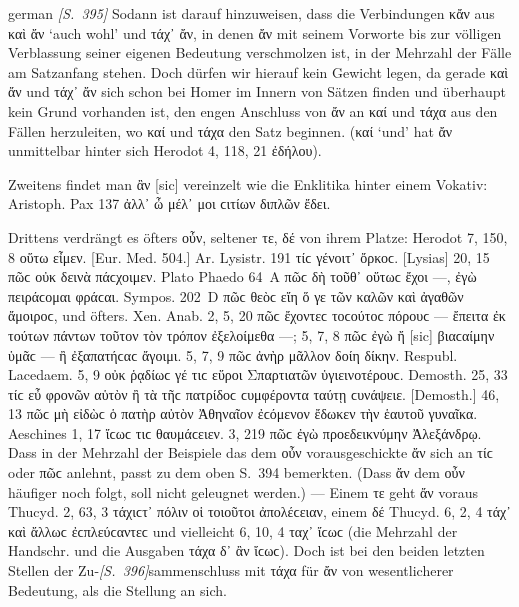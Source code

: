 \begin{otherlanguage*}{german}
\hypertarget{p395}{\emph{[S.~395]}}\label{p395} Sodann ist darauf hinzuweisen, dass die Verbindungen κἄν aus καὶ ἄν ‘auch wohl’ und τάχ᾽ ἄν, in denen ἄν mit seinem Vorworte bis zur völligen Verblassung seiner eigenen Bedeutung verschmolzen ist, in der Mehrzahl der Fälle am Satzanfang stehen. Doch dürfen wir hierauf kein Gewicht legen, da gerade καὶ ἄν und τάχ᾽ ἄν sich schon bei Homer im Innern von Sätzen finden und überhaupt kein Grund vorhanden ist, den engen Anschluss von ἄν an καί und τάχα aus den Fällen herzuleiten, wo καί und τάχα den Satz beginnen. (καί ‘und’ hat ἄν unmittelbar hinter sich Herodot 4, 118, 21  ἐδήλου).

Zweitens findet man ἂν [sic] vereinzelt wie die Enklitika hinter einem Vokativ: Aristoph. Pax 137 ἀλλ᾽ ὦ μέλ᾽  μοι ϲιτίων διπλῶν ἔδει.

Drittens verdrängt es öfters οὖν, seltener τε, δέ von ihrem Platze: Herodot 7, 150, 8 οὕτω  εἶμεν. [Eur. Med. 504.] Ar. Lysistr. 191 τίϲ  γένοιτ᾽  ὄρκοϲ. [Lysias] 20, 15 πῶϲ  οὐκ  δεινὰ πάϲχοιμεν. Plato Phaedo 64~Α πῶϲ  δὴ τοῦθ᾽ οὕτωϲ ἔχοι —, ἐγὼ πειράϲομαι φράϲαι. Sympos. 202~D πῶϲ  θεὸϲ εἴη ὅ γε τῶν καλῶν καὶ ἀγαθῶν ἄμοιροϲ, und öfters. Xen. Anab. 2, 5, 20 πῶϲ  ἔχοντεϲ τοϲούτοϲ πόρουϲ — ἔπειτα ἐκ τούτων πάντων τοῦτον  τὸν τρόπον ἐξελοίμεθα —; 5, 7, 8 πῶϲ  ἐγὼ ἤ [sic] βιαϲαίμην ὑμᾶϲ — ἢ ἐξαπατήϲαϲ ἄγοιμι. 5, 7, 9 πῶϲ  ἀνὴρ μᾶλλον δοίη δίκην. Respubl. Lacedaem. 5, 9 οὐκ  ῥᾳδίωϲ γέ τιϲ εὕροι Σπαρτιατῶν ὑγιεινοτέρουϲ. Demosth. 25, 33 τίϲ  εὖ φρονῶν αὑτὸν  ἢ τὰ τῆϲ πατρίδοϲ ϲυμφέροντα ταύτῃ ϲυνάψειε. [Demosth.] 46, 13 πῶϲ  μὴ εἰδὼϲ ὁ πατὴρ αὐτὸν Ἀθηναῖον ἐϲόμενον ἔδωκεν  τὴν ἑαυτοῦ γυναῖκα. Aeschines 1, 17 ἴϲωϲ  τιϲ θαυμάϲειεν. 3, 219 πῶϲ  ἐγὼ προεδεικνύμην Ἀλεξάνδρῳ. Dass in der Mehrzahl der Beispiele das dem οὖν vorausgeschickte ἄν sich an τίϲ oder πῶϲ anlehnt, passt zu dem oben S.~394 bemerkten. (Dass ἄν dem οὖν häufiger noch folgt, soll nicht geleugnet werden.) — Einem τε geht ἄν voraus Thucyd. 2, 63, 3 τάχιϲτ᾽  πόλιν οἱ τοιοῦτοι ἀπολέϲειαν, einem δέ Thucyd. 6, 2, 4 τάχ᾽  καὶ ἄλλωϲ ἐϲπλεύϲαντεϲ und vielleicht 6, 10, 4 ταχ᾽  ἴϲωϲ (die Mehrzahl der Handschr. und die Ausgaben τάχα δ᾽ ἂν ἴϲωϲ). Doch ist bei den beiden letzten Stellen der Zu-\hypertarget{p396}{\emph{[S.~396]}}\label{p396}sammenschluss mit τάχα für ἄν von wesentlicherer Bedeutung, als die Stellung an sich.


\end{otherlanguage*}
